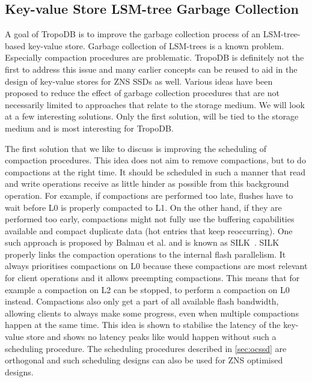 \subsection{Key-value Store LSM-tree Garbage Collection}
A goal of TropoDB is to improve the garbage collection process of an LSM-tree-based key-value store. Garbage collection of LSM-trees is a known problem. Especially compaction procedures are problematic. TropoDB is definitely not the first to address this issue and many earlier concepts can be reused to aid in the design of key-value stores for ZNS SSDs as well. Various ideas have been proposed to reduce the effect of garbage collection procedures that are not necessarily limited to approaches that relate to the storage medium. We will look at a few interesting solutions. Only the first solution, will be tied to the storage medium and is most interesting for TropoDB.

The first solution that we like to discuss is improving the scheduling of compaction procedures. This idea does not aim to remove compactions, but to do compactions at the right time. It should be scheduled in such a manner that read and write operations receive as little hinder as possible from this background operation. For example, if compactions are performed too late, flushes have to wait before L0 is properly compacted to L1. On the other hand, if they are performed
too early, compactions might not fully use the buffering capabilities available and compact duplicate data (hot entries that keep reoccurring).
One such approach is proposed by Balmau et al. and is known as SILK~\cite{balmau2019silk}. SILK properly links the
compaction operations to the internal flash parallelism. It always prioritises compactions on L0 because these compactions are most relevant for client operations and it allows preempting compactions. This means that for example a compaction on L2 can be stopped, to perform a compaction on L0 instead. Compactions also only get a part of all available flash bandwidth, allowing clients to always make some progress, even when multiple compactions happen at the same time. This idea is shown to stabilise the latency of the key-value store and shows no latency peaks like would happen without such a scheduling procedure. The scheduling procedures described in \autoref{sec:ocssd} are orthogonal and such scheduling designs can also be used for ZNS optimised designs.

